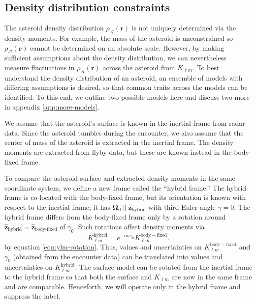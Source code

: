 \documentclass[fleqn,usenatbib]{mnras}
\renewcommand{\unit}[1]{\bm{\hat{#1}}}
\begin{document}
\subsection{Density distribution constraints}
\label{sec:density-distro}

The asteroid density distribution $\rho_\mathcal{A}(\bm r)$ is not uniquely determined via the density moments. For example, the mass of the asteroid is unconstrained so $\rho_\mathcal{A}(\bm r)$ cannot be determined on an absolute scale. However, by making sufficient assumptions about the density distribution, we can nevertheless measure fluctuations in $\rho_\mathcal{A}(\bm r)$ across the asteroid from $K_{\ell m}$. To best understand the density distribution of an asteroid, an ensemble of models with differing assumptions is desired, so that common traits across the models can be identified. To this end, we outline two possible models here and discuss two more in appendix \ref{app:more-models}.

We assume that the asteroid's surface is known in the inertial frame from radar data. Since the asteroid tumbles during the encounter, we also assume that the center of mass of the asteroid is extracted in the inertial frame. The density moments are extracted from flyby data, but these are known instead in the body-fixed frame.

To compare the asteroid surface and extracted density moments in the same coordinate system, we define a new frame called the ``hybrid frame.'' The hybrid frame is co-located with the body-fixed frame, but its orientation is known with respect to the inertial frame; it has $\bm \Omega_0 \parallel \unit z_\text{hybrid}$ with third Euler angle $\gamma = 0$. The hybrid frame differs from the body-fixed frame only by a rotation around $\unit z_\text{hybrid}=\unit z_\text{body-fixed}$ of $\gamma_0$. Such rotations affect density moments via 
\begin{equation}
  K_{\ell m}^\mathrm{hybrid} = e^{-im\gamma_0}K_{\ell m}^\mathrm{body-fixed}.
  \label{eqn:body-fixed-to-hybrid}
\end{equation}
by equation \ref{eqn:ylm-rotation}. Thus, values and  uncertainties on $K_{\ell m}^\mathrm{body-fixed}$ and $\gamma_0$ (obtained from the encounter data) can be translated into values and uncertainties on $K_{\ell m}^\mathrm{hybrid}$. The surface model can be rotated from the inertial frame to the hybrid frame so that both the surface and $K_{\ell m}$ are now in the same frame and are comparable. Henceforth, we will operate only in the hybrid frame and suppress the label.
\end{document}
